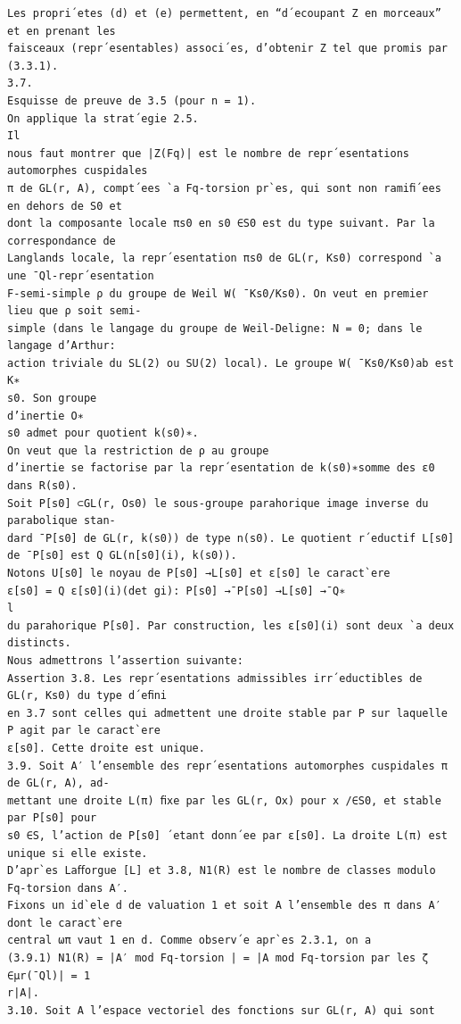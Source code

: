 \documentclass[11pt]{article}
\begin{document}
\begin{Verbatim}[breaklines=true,fontsize=\small]
Les propri´etes (d) et (e) permettent, en “d´ecoupant Z en morceaux” et en prenant les
faisceaux (repr´esentables) associ´es, d’obtenir Z tel que promis par (3.3.1).
3.7.
Esquisse de preuve de 3.5 (pour n = 1).
On applique la strat´egie 2.5.
Il
nous faut montrer que |Z(Fq)| est le nombre de repr´esentations automorphes cuspidales
π de GL(r, A), compt´ees `a Fq-torsion pr`es, qui sont non ramiﬁ´ees en dehors de S0 et
dont la composante locale πs0 en s0 ∈S0 est du type suivant. Par la correspondance de
Langlands locale, la repr´esentation πs0 de GL(r, Ks0) correspond `a une ¯Ql-repr´esentation
F-semi-simple ρ du groupe de Weil W( ¯Ks0/Ks0). On veut en premier lieu que ρ soit semi-
simple (dans le langage du groupe de Weil-Deligne: N = 0; dans le langage d’Arthur:
action triviale du SL(2) ou SU(2) local). Le groupe W( ¯Ks0/Ks0)ab est K∗
s0. Son groupe
d’inertie O∗
s0 admet pour quotient k(s0)∗.
On veut que la restriction de ρ au groupe
d’inertie se factorise par la repr´esentation de k(s0)∗somme des ε0 dans R(s0).
Soit P[s0] ⊂GL(r, Os0) le sous-groupe parahorique image inverse du parabolique stan-
dard ¯P[s0] de GL(r, k(s0)) de type n(s0). Le quotient r´eductif L[s0] de ¯P[s0] est Q GL(n[s0](i), k(s0)).
Notons U[s0] le noyau de P[s0] →L[s0] et ε[s0] le caract`ere
ε[s0] = Q ε[s0](i)(det gi): P[s0] →¯P[s0] →L[s0] →¯Q∗
l
du parahorique P[s0]. Par construction, les ε[s0](i) sont deux `a deux distincts.
Nous admettrons l’assertion suivante:
Assertion 3.8. Les repr´esentations admissibles irr´eductibles de GL(r, Ks0) du type d´eﬁni
en 3.7 sont celles qui admettent une droite stable par P sur laquelle P agit par le caract`ere
ε[s0]. Cette droite est unique.
3.9. Soit A′ l’ensemble des repr´esentations automorphes cuspidales π de GL(r, A), ad-
mettant une droite L(π) ﬁxe par les GL(r, Ox) pour x /∈S0, et stable par P[s0] pour
s0 ∈S, l’action de P[s0] ´etant donn´ee par ε[s0]. La droite L(π) est unique si elle existe.
D’apr`es Laﬀorgue [L] et 3.8, N1(R) est le nombre de classes modulo Fq-torsion dans A′.
Fixons un id`ele d de valuation 1 et soit A l’ensemble des π dans A′ dont le caract`ere
central ωπ vaut 1 en d. Comme observ´e apr`es 2.3.1, on a
(3.9.1) N1(R) = |A′ mod Fq-torsion | = |A mod Fq-torsion par les ζ ∈µr(¯Ql)| = 1
r|A|.
3.10. Soit A l’espace vectoriel des fonctions sur GL(r, A) qui sont


\end{Verbatim}
\end{document}
